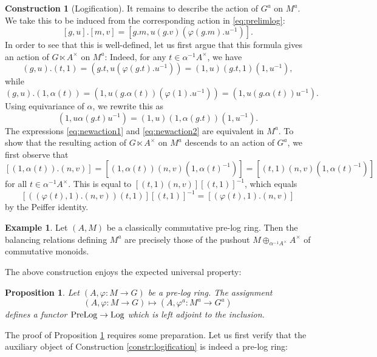 \documentclass[a4paper,10pt%
]{amsart}
\numberwithin{equation}{section}
\newtheorem{proposition}[subsection]{Proposition}
\theoremstyle{definition}
\newtheorem{example}[subsection]{Example}
\newtheorem{construction}[subsection]{Construction}
\renewcommand{\:}{\colon}
\begin{document}
\begin{construction}[Logification]
It remains to describe the action of $G^a$ on $M^a$. We take this to be induced from the corresponding action in \eqref{eq:prelimlog}: \[[g, u].[m, v] = [g.m, u(g.v)(\varphi(g.m).u^{-1})].\] In order to see that this is well-defined, let us first argue that this formula gives an action of $G \ltimes A^\times$ on $M^a$: Indeed, for any $t \in \alpha^{-1}A^\times$, we have \begin{equation}\label{eq:newaction1}(g, u).(t, 1) = (g.t, u(\varphi(g.t).u^{-1})) = (1, u)(g.t, 1)(1, u^{-1}),\end{equation} while \[(g, u).(1, \alpha(t)) = (1, u(g.\alpha(t))(\varphi(1).u^{-1})) = (1, u(g.\alpha(t))u^{-1}).\] Using equivariance of $\alpha$, we rewrite this as \begin{equation}\label{eq:newaction2}(1, u\alpha(g.t)u^{-1}) = (1, u)(1, \alpha(g.t))(1, u^{-1}).\end{equation} The expressions \eqref{eq:newaction1} and \eqref{eq:newaction2} are equivalent in $M^a$. To show that the resulting action of $G \ltimes A^\times$ on $M^a$ descends to an action of $G^a$, we first observe that \[[(1, \alpha(t)).(n, v)] = [(1, \alpha(t))(n, v)(1, \alpha(t)^{-1})] = [(t, 1)(n, v)(1, \alpha(t)^{-1})]\] for all $t \in \alpha^{-1}A^\times$. This is equal to $[(t, 1)(n, v)][(t, 1)]^{-1}$, which equals \[[((\varphi(t), 1).(n, v))(t, 1)][(t, 1)]^{-1} = [(\varphi(t), 1).(n, v)]\] by the Peiffer identity.
\end{construction}

\begin{example} Let $(A, M)$ be a classically commutative pre-log ring. Then the balancing relations defining $M^a$ are precisely those of the pushout $M \oplus_{\alpha^{-1}A^\times} A^\times$ of commutative monoids. 
\end{example}

\noindent The above construction enjoys the expected universal property:

\begin{proposition}\label{prop:logification} Let $(A, \varphi \colon M \to G)$ be a pre-log ring. The assignment \[(A, \varphi \colon M \to G) \mapsto (A, \varphi^a \colon M^a \to G^a)\] defines a functor ${\rm PreLog} \to {\rm Log}$ which is left adjoint to the inclusion. 
\end{proposition}

The proof of Proposition \ref{prop:logification} requires some preparation. Let us first verify that the auxiliary object of Construction \ref{constr:logification} is indeed a pre-log ring: 
\end{document}
